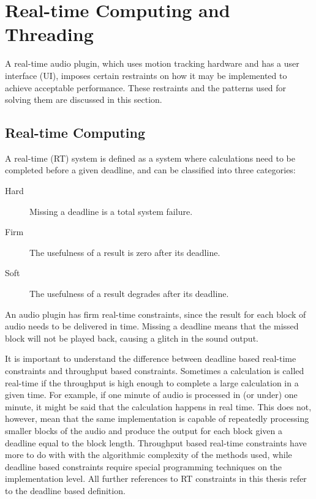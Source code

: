 \section{Real-time Computing and Threading}
\label{sec:real_time_and_threading}

A real-time audio plugin,
which uses motion tracking hardware
and has a user interface (UI),
imposes certain restraints on how it may be implemented
to achieve acceptable performance.
These restraints and the patterns used for solving them
are discussed in this section.

\subsection{Real-time Computing}

A real-time (RT) system is defined as a system where calculations
need to be completed before a given deadline,
and can be classified into three categories:
\begin{description}
\item[Hard]
Missing a deadline is a total system failure.
\item[Firm]
The usefulness of a result is zero after its deadline.
\item[Soft]
The usefulness of a result degrades after its deadline.
\end{description}
An audio plugin has firm real-time constraints,
since the result for each block of audio needs to be delivered in time.
Missing a deadline means that the missed block will not be played back,
causing a glitch in the sound output.

It is important to understand the difference between
deadline based real-time constraints
and throughput based constraints.
Sometimes a calculation is called real-time
if the throughput is high enough to complete
a large calculation in a given time.
For example, if one minute of audio is
processed in (or under) one minute,
it might be said that the calculation happens in real time.
This does not, however, mean that the same
implementation is capable of repeatedly processing smaller
blocks of the audio and produce the output for each block
given a deadline equal to the block length.
Throughput based real-time constraints have
more to do with with the algorithmic complexity
of the methods used,
while deadline based constraints
require special programming techniques on the implementation level.
All further references to RT constraints in this thesis
refer to the deadline based definition.

